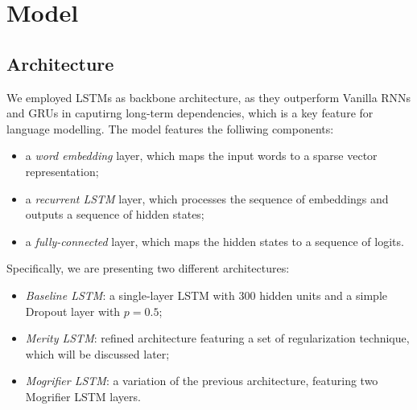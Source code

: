 \section{Model}
\label{sec:4_model}
 
\subsection{Architecture}
\label{sec:4_arch}
We employed LSTMs as backbone architecture, as they outperform Vanilla RNNs and GRUs in caputirng long-term dependencies, which is a key feature for language modelling. The model features the folliwing components:
\begin{itemize}
    \item a \emph{word embedding} layer, which maps the input words to a sparse vector representation;
    \item a \emph{recurrent LSTM} layer, which processes the sequence of embeddings and outputs a sequence of hidden states;
    \item a \emph{fully-connected} layer, which maps the hidden states to a sequence of logits.
\end{itemize}
Specifically, we are presenting two different architectures:
\begin{itemize}
    \item \emph{Baseline LSTM}: a single-layer LSTM with \(300\) hidden units and a simple Dropout layer with \(p=0.5\);
    \item \emph{Merity LSTM}: refined architecture featuring a set of regularization technique, which will be discussed later;
    \item \emph{Mogrifier LSTM}: a variation of the previous architecture, featuring two Mogrifier LSTM layers.
\end{itemize}

